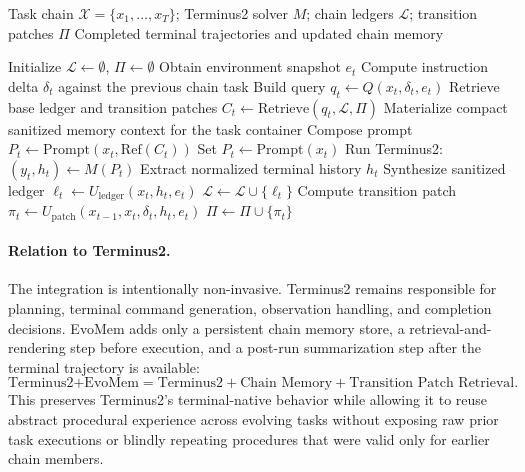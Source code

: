\documentclass{article}
\begin{document}
\begin{algorithm}[H]
\caption{EvoMem: Chain-Scoped Patch Memory for Terminus2}
\label{alg:evomem_terminus2}
\begin{algorithmic}[1]
\Require Task chain $\mathcal{X}=\{x_1,\ldots,x_T\}$; Terminus2 solver $M$; chain ledgers $\mathcal{L}$; transition patches $\Pi$
\Ensure Completed terminal trajectories and updated chain memory

\State Initialize $\mathcal{L}\gets\emptyset$, $\Pi\gets\emptyset$
    \State Obtain environment snapshot $e_t$
        \State Compute instruction delta $\delta_t$ against the previous chain task
        \State Build query $q_t\leftarrow Q(x_t,\delta_t,e_t)$
        \State Retrieve base ledger and transition patches $C_t\leftarrow \mathrm{Retrieve}(q_t,\mathcal{L},\Pi)$
        \State Materialize compact sanitized memory context for the task container
        \State Compose prompt $P_t\leftarrow \mathrm{Prompt}(x_t,\mathrm{Ref}(C_t))$
    \Else
        \State Set $P_t\leftarrow \mathrm{Prompt}(x_t)$
    \EndIf
    \State Run Terminus2: $(y_t,h_t)\leftarrow M(P_t)$
    \State Extract normalized terminal history $h_t$
    \State Synthesize sanitized ledger $\ell_t\leftarrow U_{\mathrm{ledger}}(x_t,h_t,e_t)$
    \State $\mathcal{L}\leftarrow\mathcal{L}\cup\{\ell_t\}$
        \State Compute transition patch $\pi_t\leftarrow U_{\mathrm{patch}}(x_{t-1},x_t,\delta_t,h_t,e_t)$
        \State $\Pi\leftarrow\Pi\cup\{\pi_t\}$
    \EndIf
\EndFor
\end{algorithmic}
\end{algorithm}

\paragraph{Relation to Terminus2.}
The integration is intentionally non-invasive. Terminus2 remains responsible for planning, terminal command generation, observation handling, and completion decisions. EvoMem adds only a persistent chain memory store, a retrieval-and-rendering step before execution, and a post-run summarization step after the terminal trajectory is available:
\[
\text{Terminus2+EvoMem}
=
\text{Terminus2}
+
\text{Chain Memory}
+
\text{Transition Patch Retrieval}.
\]
This preserves Terminus2's terminal-native behavior while allowing it to reuse abstract procedural experience across evolving tasks without exposing raw prior task executions or blindly repeating procedures that were valid only for earlier chain members.
\end{document}
